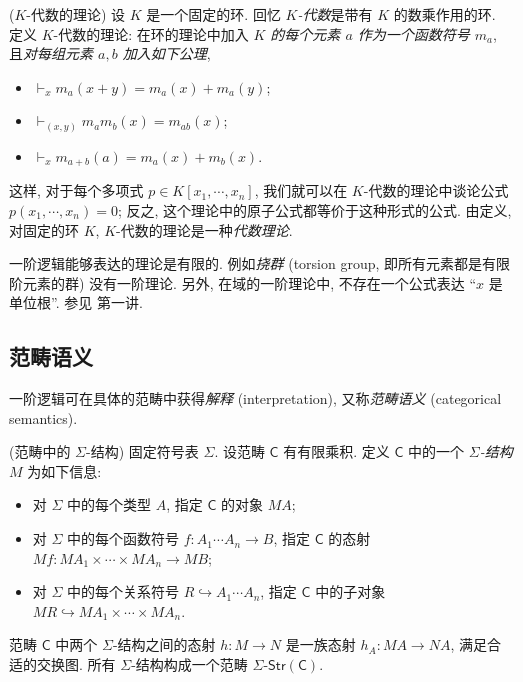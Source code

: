 \begin{example}
	{($K$-代数的理论)}
	设 $K$ 是一个固定的环. 回忆 \emph{$K$-代数}是带有 $K$ 的数乘作用的环. 定义 $K$-代数的理论: 在环的理论中加入 \emph{$K$ 的每个元素 $a$ 作为一个函数符号 $m_a$}, 且\emph{对每组元素 $a,b$ 加入如下公理},
	\begin{itemize}
		\item $\vdash_x m_a(x+y) = m_a(x) + m_a(y)$;
		\item $\vdash_{(x,y)} m_am_b (x) = m_{ab}(x)$;
		\item $\vdash_x m_{a+b}(a) = m_a(x) + m_b(x)$.
	\end{itemize}
	这样, 对于每个多项式 $p\in K[x_1,\cdots,x_n]$, 我们就可以在 $K$-代数的理论中谈论公式 $p(x_1,\cdots,x_n) = 0$; 反之, 这个理论中的原子公式都等价于这种形式的公式.
	由定义, 对固定的环 $K$, $K$-代数的理论是一种\emph{代数理论}.
\end{example}

\begin{remark}
	{}
	一阶逻辑能够表达的理论是有限的. 例如\emph{挠群} (torsion group, 即所有元素都是有限阶元素的群) 没有一阶理论.
	另外, 在域的一阶理论中, 不存在一个公式表达 ``$x$ 是单位根''. 参见 \cite{Lurie-Categorical-Logic} 第一讲.
\end{remark}

\subsection{范畴语义}

一阶逻辑可在具体的范畴中获得\emph{解释} (interpretation), 又称\emph{范畴语义} (categorical semantics).

\begin{definition}
	{(范畴中的 $\Sigma$-结构)}
	固定符号表 $\Sigma$. 设范畴 $\mathsf C$ 有有限乘积.
	定义 $\mathsf C$ 中的一个 \emph{$\Sigma$-结构} $M$ 为如下信息:
	\begin{itemize}
		\item 对 $\Sigma$ 中的每个类型 $A$, 指定 $\mathsf C$ 的对象 $MA$;
		\item 对 $\Sigma$ 中的每个函数符号 $f\colon A_1\cdots A_n \to B$, 指定 $\mathsf C$ 的态射
		$Mf \colon MA_1\times\cdots\times MA_n \to MB$;
		\item 对 $\Sigma$ 中的每个关系符号 $R \hookrightarrow A_1\cdots A_n$, 指定 $\mathsf C$ 中的子对象
		$MR \hookrightarrow MA_1\times\cdots\times MA_n$.
	\end{itemize}
	
	范畴 $\mathsf C$ 中两个 $\Sigma$-结构之间的态射 $h\colon M\to N$ 是一族态射 $h_A \colon MA \to NA$, 满足合适的交换图. 所有 $\Sigma$-结构构成一个范畴 $\Sigma\text{-}\mathsf{Str}(\mathsf C)$.
\end{definition}

